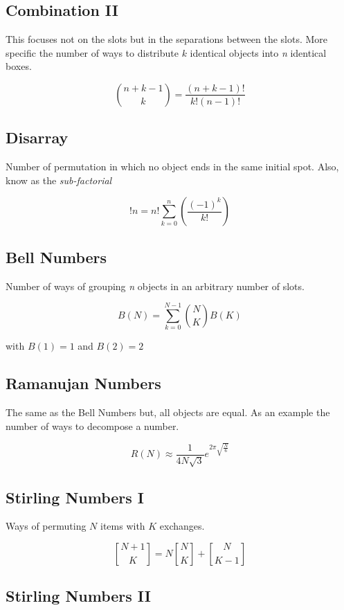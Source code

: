 \subsection{Combination II}

This focuses not on the slots but in the separations between the slots.
More specific the number of ways to distribute \(k\) identical objects into \emph{n} identical boxes. 

\[
    \binom{n + k - 1}{k} = \frac{(n + k - 1)!}{k!(n - 1)!}
\]

\subsection{Disarray}

Number of permutation in which no object ends in the same initial spot. Also, know as the 
\emph{sub-factorial}

\[
    !n = n! \sum_{k = 0}^{n} \left(\frac{{(-1)}^k}{k!}\right)
\]

\subsection{Bell Numbers}

Number of ways of grouping \emph{n} objects in an arbitrary number of slots.

\[
    B(N) = \sum_{k = 0}^{N-1}\binom{N}{K}B(K)
\]

with \(B(1) = 1\) and \(B(2) = 2\)

\subsection{Ramanujan Numbers}

The same as the Bell Numbers but, all objects are equal. As an example the number of ways
to decompose a number.

\[
    R(N) \approx \frac{1}{4N\sqrt{3}} e^{2\pi \sqrt{\frac{N}{6}}}
\]

\subsection{Stirling Numbers I}

Ways of permuting \(N\) items with \(K\) exchanges.

\[
    \genfrac{[}{]}{0pt}{}{N + 1}{K} = N \genfrac{[}{]}{0pt}{}{N}{K} + \genfrac{[}{]}{0pt}{}{N}{K - 1}
\]


\subsection{Stirling Numbers II}

